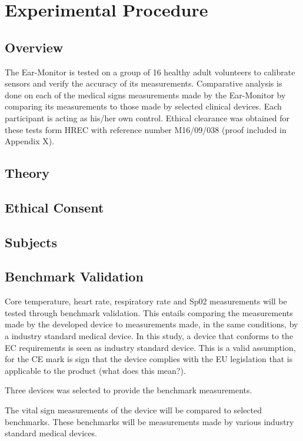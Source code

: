\chapter{Experimental Procedure}
\label{chp:DEM}
\section{Overview}
The Ear-Monitor is tested on a group of 16 healthy adult volunteers to calibrate sensors and verify the accuracy of its measurements. Comparative analysis is done on each of the medical signs measurements made by the Ear-Monitor by comparing its measurements to those made by selected clinical devices. Each participant is acting as his/her own control. Ethical clearance was obtained for these tests form HREC with reference number M16/09/038 (proof included in Appendix X).

\medskip



\section{Theory}
\section{Ethical Consent}
\section{Subjects}

\section{Benchmark Validation}
Core temperature, heart rate, respiratory rate and Sp02 measurements will be tested through benchmark validation. This entails comparing the measurements made by the developed device to measurements made, in the same conditions, by a industry standard medical device. In this study, a device that conforms to the EC requirements is seen as industry standard device. This is a valid assumption, for the CE mark is sign that the device complies with the EU legislation that is applicable to the product (what does this mean?).

Three devices was selected to provide the benchmark measurements. 


The vital sign measurements of the device will be compared to selected benchmarks. These benchmarks will be measurements made by various industry standard medical devices.





